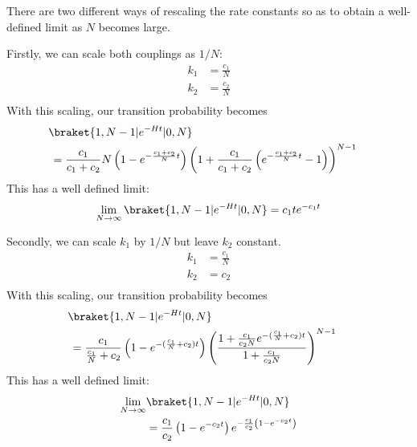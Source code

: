 There are two different ways of rescaling the rate constants so as to obtain a well-defined limit as $N$ becomes large.

Firstly, we can scale both couplings as $1/N$:
\begin{align*}
k_1 &= \frac{c_1}{N} \\
k_2 &= \frac{c_2}{N} \\
\end{align*}
With this scaling, our transition probability becomes
\begin{align*}
 &\!\braket{1, N-1 | e^{-Ht} | 0, N} \cr &=
 \frac{c_1}{c_1 + c_2} N \left( 1 - e^{-\frac{c_1 + c_2}{N} t} \right)
 \left( 1 + \frac{c_1}{c_1 + c_2} \left( e^{-\frac{c_1 + c_2}{N} t} - 1 \right) \right)^{N-1}
\end{align*}
This has a well defined limit:
\begin{align*}
 \lim_{N \to \infty} \braket{1, N-1 | e^{-Ht} | 0, N} =
 c_1 t e^{-c_1 t}
\end{align*}

Secondly, we can scale $k_1$ by $1/N$  but leave $k_2$ constant.
\begin{align*}
k_1 &= \frac{c_1}{N} \\
k_2 &= c_2 \\
\end{align*}
With this scaling, our transition probability becomes
\begin{align*}
 &\!\braket{1, N-1 | e^{-Ht} | 0, N} \cr &=
 \frac{c_1}{\frac{c_1}{N} + c_2}
 \left( 1 - e^{-(\frac{c_1}{N} + c_2) t} \right)
 \left( \frac{1 + \frac{c_1}{c_2 N} e^{-(\frac{c_1}{N} + c_2) t}}{1 + \frac{c_1}{c_2 N}} \right)^{N-1}
\end{align*}
This has a well defined limit:
\begin{align*}
 \lim_{N \to \infty} &\braket{1, N-1 | e^{-Ht} | 0, N} \\ &=
 \frac{c_1}{c_2}
 \left( 1 - e^{-c_2 t} \right)
 e^{- \frac{c_1}{c_2} \left( 1 - e^{-c_2 t} \right)}
\end{align*}

